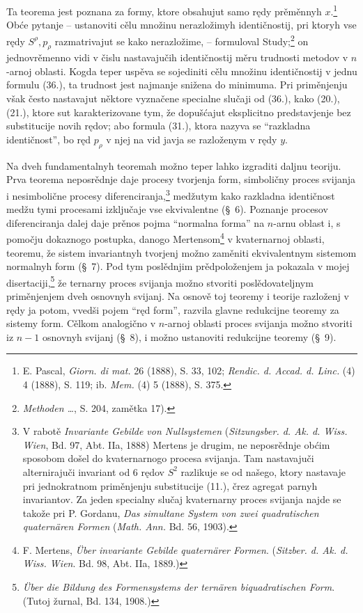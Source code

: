\documentclass[11pt]{article}
\begin{document}
Ta teorema jest poznana za formy, ktore obsahujut samo rędy prěměnnyh $x$.\footnote{E. Pascal, \emph{Giorn. di mat.} 26 (1888), S. 33, 102; \emph{Rendic. d. Accad. d. Linc.} (4) 4 (1888), S. 119; ib. \emph{Mem.} (4) 5 (1888), S. 375.} Obće pytanje -- ustanoviti cělu množinu nerazložimyh identičnostij, pri ktoryh vse rędy $S^\rho,p_\rho$ razmatrivajut se kako nerazložime, -- formuloval Study;\footnote{\emph{Methoden \dots}, S. 204, zamětka 17).} on jednovrěmenno vidi v čislu nastavajučih identičnostij měru trudnosti metodov v $n$-arnoj oblasti. Kogda teper uspěva se sojediniti cělu množinu identičnostij v jednu formulu (36.), ta trudnost jest najmanje snižena do minimuma. Pri priměnjenju však često nastavajut něktore vyznačene specialne slučaji od (36.), kako (20.), (21.), ktore sut karakterizovane tym, že dopušćajut eksplicitno predstavjenje bez substitucije novih rędov; abo formula (31.), ktora nazyva se ``razkladna identičnost'', bo ręd $p_\rho$ v njej na vid javja se razloženym v rędy $y$.

Na dveh fundamentalnyh teoremah možno teper lahko izgraditi daljnu teoriju. Prva teorema neposrědnje daje procesy tvorjenja form, simboličny proces svijanja i nesimbolične procesy diferenciranja,\footnote{V rabotě \emph{Invariante Gebilde von Nullsystemen} (\emph{Sitzungsber. d. Ak. d. Wiss. Wien}, Bd. 97, Abt. IIa, 1888) Mertens je drugim, ne neposrědnje obćim sposobom došel do kvaternarnogo procesa svijanja. Tam nastavajuči alternirajuči invariant od 6 rędov $S^2$ razlikuje se od našego, ktory nastavaje pri jednokratnom priměnjenju substitucije (11.), črez agregat parnyh invariantov. Za jeden specialny slučaj kvaternarny proces svijanja najde se takože pri P. Gordanu, \emph{Das simultane System von zwei quadratischen quaternären Formen} (\emph{Math. Ann.} Bd. 56, 1903).} medžutym kako razkladna identičnost medžu tymi procesami izključaje vse ekvivalentne (\S\ 6). Poznanje procesov diferenciranja dalej daje prěnos pojma ``normalna forma'' na $n$-arnu oblast i, s pomočju dokaznogo postupka, danogo Mertensom\footnote{F. Mertens, \emph{Über invariante Gebilde quaternärer Formen}. (\emph{Sitzber. d. Ak. d. Wiss. Wien}. Bd. 98, Abt. IIa, 1889.)} v kvaternarnoj oblasti, teoremu, že sistem invariantnyh tvorjenj možno zaměniti ekvivalentnym sistemom normalnyh form (\S\ 7). Pod tym poslědnjim prědpoloženjem ja pokazala v mojej disertaciji,\footnote{\emph{Über die Bildung des Formensystems der ternären biquadratischen Form}. (Tutoj žurnal, Bd. 134, 1908.)} že ternarny proces svijanja možno stvoriti poslědovateljnym priměnjenjem dveh osnovnyh svijanj. Na osnově toj teoremy i teorije razloženj v rędy ja potom, vvedši pojem ``ręd form'', razvila glavne redukcijne teoremy za sistemy form. Cělkom analogično v $n$-arnoj oblasti proces svijanja možno stvoriti iz $n-1$ osnovnyh svijanj (\S\ 8), i možno ustanoviti redukcijne teoremy (\S\ 9).
\end{document}
